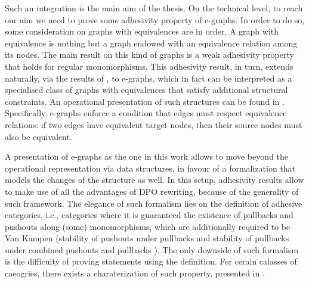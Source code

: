 Such an integration is the main aim of the thesis.
 On the technical level, to reach our aim we need to prove some adhesivity property of e-graphs. 
 In order to do so, some consideration on graphs with equivalences are in order. 
 A graph with equivalence is nothing but a graph endowed with an equivalence relation among its nodes. 
 The main result on this kind of graphs is a weak adhesivity property that holds for regular monomorphisms. 
%
%
%
 This adhesivity result, in turn, extends naturally, via the results of \cite{castelnovo2022newcriterionmathcalmmathcalnadhesivity}, to e-graphs, which in fact can be interpreted as a specialised class of graphs with equivalences that satisfy additional structural constraints. 
 An operational presentation of such structures can be found in \cite{egg}. 
 Specifically, e-graphs enforce a condition that edges must respect equivalence relations: if two edges have equivalent target nodes, then their source nodes must also be equivalent.

\iffalse 
A presentation of e-graphs as the one in this work allows to move beyond the operational representation via data structures, in favour of a formalization that models the changes of the structure as well.
In this setup, adhesivity results allow to make use of all the advantages of DPO rewriting, because of the generality of such framework.
The elegance of such formalism lies on the definition of adhesive categories, i.e., categories where it is guaranteed the existence of pullbacks and pushouts along (some) monomorphisms, which are additionally required to be Van Kampen (stability of pushouts under pullbacks and stability of pullbacks under combined pushouts and pullbacks \cite{Ehrig_Golas}).
The only downside of such formalism is the difficulty of proving statements using the definition. 
For cerain calasses of caeogries, there exists a charaterization of such property, presented in \cite{castelnovo2022newcriterionmathcalmmathcalnadhesivity}.


